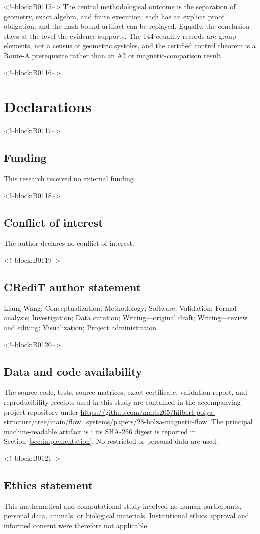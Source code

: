 \documentclass[11pt,a4paper]{article}
\theoremstyle{definition}
\begin{document}
<!--block:B0115-->
The central methodological outcome is the separation of geometry, exact
algebra, and finite execution: each has an explicit proof obligation, and the
hash-bound artifact can be replayed.  Equally, the conclusion stays at the
level the evidence supports.  The 144 equality records are group elements,
not a census of geometric systoles, and the certified control theorem is a
Route-A prerequisite rather than an A2 or magnetic-comparison result.

<!--block:B0116-->
\section*{Declarations}

<!--block:B0117-->
\subsection*{Funding}
This research received no external funding.

<!--block:B0118-->
\subsection*{Conflict of interest}
The author declares no conflict of interest.

<!--block:B0119-->
\subsection*{CRediT author statement}
Liang Wang: Conceptualization; Methodology; Software; Validation; Formal
analysis; Investigation; Data curation; Writing---original draft;
Writing---review and editing; Visualization; Project administration.

<!--block:B0120-->
\subsection*{Data and code availability}
The source code, tests, source matrices, exact certificate, validation report,
and reproducibility receipts used in this study are contained in the
accompanying project repository under
\url{https://github.com/maris205/hilbert-polya-structure/tree/main/flow_systems/papers/28-bolza-magnetic-flow}.
The principal machine-readable artifact is
; its SHA-256
digest is reported in Section~\ref{sec:implementation}.  No restricted or
personal data are used.

<!--block:B0121-->
\subsection*{Ethics statement}
This mathematical and computational study involved no human participants,
personal data, animals, or biological materials.  Institutional ethics
approval and informed consent were therefore not applicable.
\end{document}
